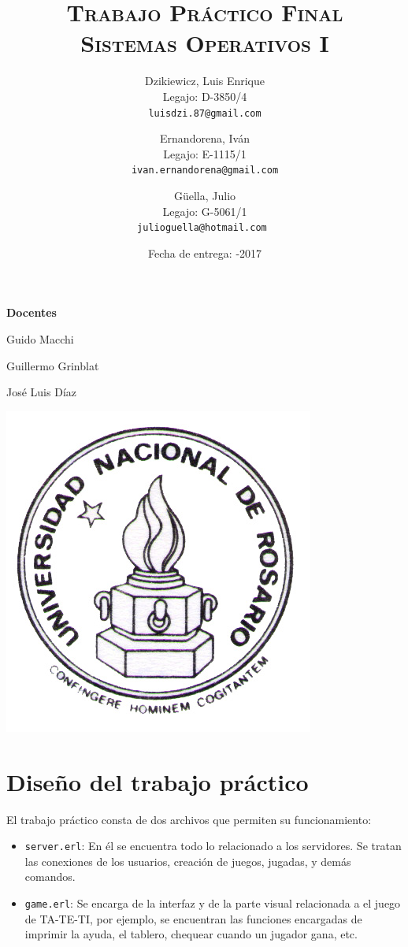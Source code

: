\documentclass[a4paper]{article}
\author{
        Dzikiewicz, Luis Enrique\\
        Legajo: D-3850/4\\
        \texttt{luisdzi.87@gmail.com}
        \and Ernandorena, Iván\\
        Legajo: E-1115/1\\
        \texttt{ivan.ernandorena@gmail.com}
        \and Güella, Julio\\
        Legajo: G-5061/1\\
        \texttt{julioguella@hotmail.com }
}
\date{
    Fecha de entrega: -2017
}
\title {
    \Huge  \textsc{Trabajo Práctico Final\\}
    \large \textsc{Sistemas Operativos I}
}
\newcommand{\blacktr}[0]{\item[$\blacktriangleright$]}
\begin{document}

    \maketitle

    \thispagestyle{empty}

    \begin{center}
         \large \bf Docentes
    \end{center}

    \begin{center}
      Guido Macchi
      
      Guillermo Grinblat

      José Luis Díaz
        \vspace{2cm}

        \includegraphics[scale=1.5]{Logo-Unr}
    

    \end{center}


\newpage




\section*{Diseño del trabajo práctico}

El trabajo práctico consta de dos archivos que permiten su funcionamiento:
\begin{itemize}
  \blacktr \texttt{server.erl}: En él se encuentra todo lo relacionado a los servidores. Se tratan las conexiones de los usuarios, creación de juegos, jugadas, y demás comandos.
  \blacktr \texttt{game.erl}: Se encarga de la interfaz y de la parte visual relacionada a el juego de TA-TE-TI, por ejemplo, se encuentran las funciones encargadas de imprimir la ayuda, el tablero, chequear cuando un jugador gana, etc. 
\end{itemize}
\end{document}
